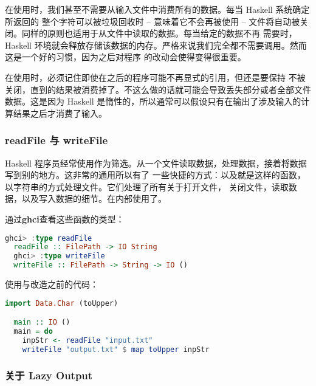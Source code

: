 \documentclass[./main.tex]{subfiles}
\begin{document}
在使用时，我们甚至不需要从输入文件中消费所有的数据。每当 Haskell 系统确定所返回的
整个字符可以被垃圾回收时 -- 意味着它不会再被使用 -- 文件将自动被关闭。同样的原则也适用于从文件中读取的数据。每当给定的数据不再
需要时，Haskell 环境就会释放存储该数据的内存。严格来说我们完全都不需要调用。然而这是一个好的习惯，因为之后对程序
的改动会使得变得很重要。

\begin{awarn}
  在使用时，必须记住即使在之后的程序可能不再显式的引用，但还是要保持
  不被关闭，直到的结果被消费掉了。不这么做的话就可能会导致丢失部分或者全部文件数据。这是因为 Haskell
  是惰性的，所以通常可以假设只有在输出了涉及输入的计算结果之后才消费了输入。
\end{awarn}

\subsubsection*{readFile 与 writeFile}

Haskell 程序员经常使用作为筛选。从一个文件读取数据，处理数据，接着将数据写到别的地方。这非常的通用所以有了
一些快捷的方式：以及就是这样的函数，以字符串的方式处理文件。它们处理了所有关于打开文件，
关闭文件，读取数据，以及写入数据的细节。在内部使用了。

通过\textbf{ghci}查看这些函数的类型：

\begin{lstlisting}[language=Haskell]
  ghci> :type readFile
  readFile :: FilePath -> IO String
  ghci> :type writeFile
  writeFile :: FilePath -> String -> IO ()
\end{lstlisting}

使用与改造之前的代码：

\begin{lstlisting}[language=Haskell]
  import Data.Char (toUpper)

  main :: IO ()
  main = do
    inpStr <- readFile "input.txt"
    writeFile "output.txt" $ map toUpper inpStr
\end{lstlisting}

\subsubsection*{关于 Lazy Output}
\end{document}
